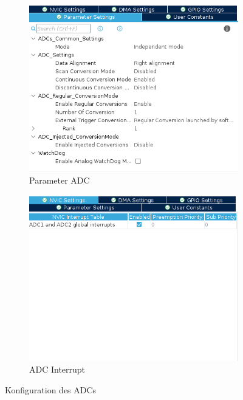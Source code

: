 \begin{figure}[h]
    \centering
    \begin{subfigure}{0.45\textwidth}
        \centering
        \includegraphics[width=\textwidth]{Pictures/adc_param.png}
        \caption{Parameter ADC}
        \label{img: Parameter ADC}
    \end{subfigure}
    \begin{subfigure}{0.45\textwidth}
        \centering
        \includegraphics[width=\textwidth]{Pictures/adc_nvic.png}
        \caption{ADC Interrupt}
        \label{img: ADC Interrupt}
    \end{subfigure}
    \caption{Konfiguration des \acp{ADC}}
    \label{img: ADC config}
  \end{figure}

